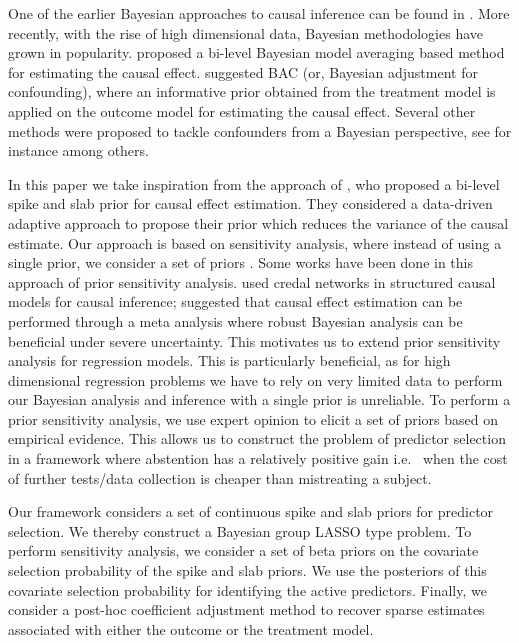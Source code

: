 \documentclass[preprint,12pt]{elsarticle}
\begin{document}
One of the earlier Bayesian approaches to causal inference
can be found in \citep{rubin1978}. More recently,
with the rise of high dimensional data,
Bayesian methodologies have grown in popularity.
 proposed a bi-level 
Bayesian model averaging based method for estimating the causal 
effect.  suggested BAC (or, Bayesian adjustment for
confounding),
where an informative prior obtained from
the treatment model is applied on the outcome model for
estimating the causal effect. Several other methods were
proposed to tackle confounders from a Bayesian perspective,
see for instance \citep{Zigler2014,Hahn2018} among others.

In this paper we take inspiration from the approach of \citet{koch2020}, who proposed a bi-level spike and slab prior for causal effect 
estimation. They considered a data-driven adaptive approach to
propose their prior which reduces the variance of the causal estimate. 
Our approach is based on
sensitivity analysis, where instead of using a single prior, 
we consider a set of priors \citep{BERGER1990303}. %
Some works have been done in this approach of
prior sensitivity analysis. \citet{zaffalon20a} 
used credal networks in structured causal models
for causal inference; \citet{raices_cruz22} suggested
that causal effect estimation can be performed 
through a meta analysis where robust Bayesian analysis 
can be beneficial under severe uncertainty. 
This motivates us to extend prior sensitivity analysis for 
regression models. This is particularly beneficial, as for high dimensional regression problems 
we have to rely on very limited data to perform our Bayesian analysis and 
inference with a single prior
is unreliable.
To perform a prior sensitivity analysis, we use expert opinion to elicit a set of priors 
based on empirical evidence. 
This allows us to construct the problem of 
predictor selection
in a framework where abstention has a relatively positive gain i.e.~
when the cost of further tests/data collection is cheaper than
mistreating a subject.

Our framework considers a set of continuous spike and slab priors 
\citep{ishwaran2005} for
predictor selection.
We thereby construct a Bayesian group LASSO \citep{xu2015} type problem.
To perform sensitivity analysis,
we consider a set of beta priors on the covariate selection 
probability of the spike and slab priors. We use the posteriors of this
covariate selection probability for identifying the active predictors. Finally, 
we consider a post-hoc coefficient adjustment method \citep{hahn2015}
to recover sparse estimates associated with either the outcome or the
treatment model. 
\end{document}

